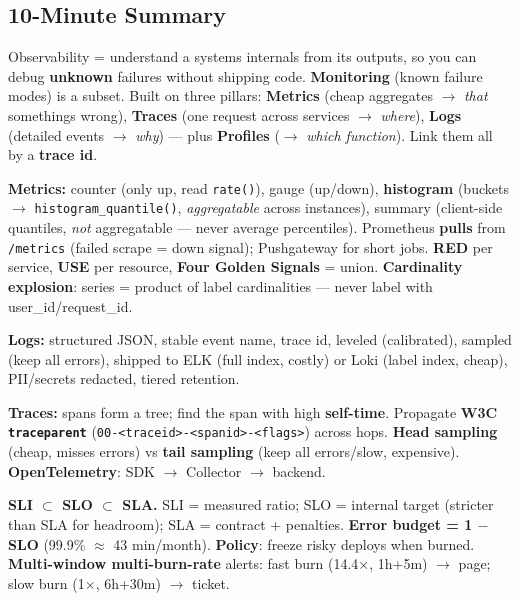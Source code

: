 \documentclass[11pt]{article}
\begin{document}
\subsection{10-Minute Summary}\label{10-minute-summary}

Observability = understand a system\textquotesingle s internals from its outputs, so you can debug \textbf{unknown} failures without shipping code. \textbf{Monitoring} (known failure modes) is a subset. Built on three pillars: \textbf{Metrics} (cheap aggregates \(\rightarrow\) \emph{that} something\textquotesingle s wrong), \textbf{Traces} (one request across services \(\rightarrow\) \emph{where}), \textbf{Logs} (detailed events \(\rightarrow\) \emph{why}) --- plus \textbf{Profiles} (\(\rightarrow\) \emph{which function}). Link them all by a \textbf{trace id}.

\textbf{Metrics:} counter (only up, read \texttt{rate()}), gauge (up/down), \textbf{histogram} (buckets \(\rightarrow\) \texttt{histogram\_quantile()}, \emph{aggregatable} across instances), summary (client-side quantiles, \emph{not} aggregatable --- never average percentiles). Prometheus \textbf{pulls} from \texttt{/metrics} (failed scrape = down signal); Pushgateway for short jobs. \textbf{RED} per service, \textbf{USE} per resource, \textbf{Four Golden Signals} = union. \textbf{Cardinality explosion}: series = product of label cardinalities --- never label with user\_id/request\_id.

\textbf{Logs:} structured JSON, stable event name, trace id, leveled (calibrated), sampled (keep all errors), shipped to ELK (full index, costly) or Loki (label index, cheap), PII/secrets redacted, tiered retention.

\textbf{Traces:} spans form a tree; find the span with high \textbf{self-time}. Propagate \textbf{W3C \texttt{traceparent}} (\texttt{00-\textless{}traceid\textgreater{}-\textless{}spanid\textgreater{}-\textless{}flags\textgreater{}}) across hops. \textbf{Head sampling} (cheap, misses errors) vs \textbf{tail sampling} (keep all errors/slow, expensive). \textbf{OpenTelemetry}: SDK \(\rightarrow\) Collector \(\rightarrow\) backend.

\textbf{SLI \(\subset\) SLO \(\subset\) SLA.} SLI = measured ratio; SLO = internal target (stricter than SLA for headroom); SLA = contract + penalties. \textbf{Error budget = 1 \(-\) SLO} (99.9\% \(\approx\) 43 min/month). \textbf{Policy}: freeze risky deploys when burned. \textbf{Multi-window multi-burn-rate} alerts: fast burn (14.4\(\times\), 1h+5m) \(\rightarrow\) page; slow burn (1\(\times\), 6h+30m) \(\rightarrow\) ticket.
\end{document}

